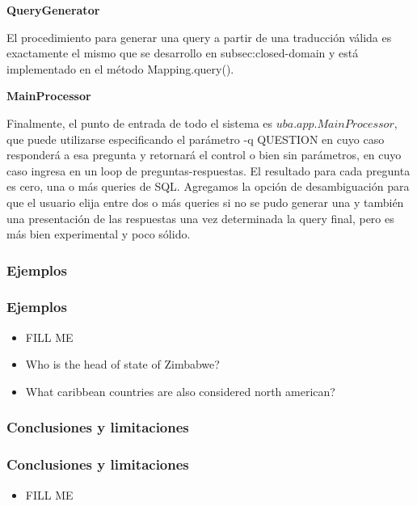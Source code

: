 \begin{frame}
\textbf{QueryGenerator}

El procedimiento para generar una query a partir de una traducción válida es exactamente el mismo que se desarrollo en subsec:closed-domain y está implementado en el método Mapping.query().


\textbf{MainProcessor}

Finalmente, el punto de entrada de todo el sistema es $uba.app.MainProcessor$, que puede utilizarse especificando el parámetro -q QUESTION en cuyo caso responderá a esa pregunta y retornará el control o bien sin parámetros, en cuyo caso ingresa en un loop de preguntas-respuestas. El resultado para cada pregunta es cero, una o más queries de SQL.
Agregamos la opción de desambiguación para que el usuario elija entre dos o más queries si no se pudo generar una y también una presentación de las respuestas una vez determinada la query final, pero es más bien experimental y poco sólido.
\end{frame}

\subsubsection*{Ejemplos}
\begin{frame}
\frametitle{Ejemplos}
  \begin{itemize}
    \item {\color{red} FILL ME}
    \item Who is the head of state of Zimbabwe?
    \item What caribbean countries are also considered north american?
  \end{itemize}
\end{frame}
\subsubsection*{Conclusiones y limitaciones}
\begin{frame}
\frametitle{Conclusiones y limitaciones}
  \begin{itemize}
    \item {\color{red} FILL ME}
  \end{itemize}
\end{frame}
